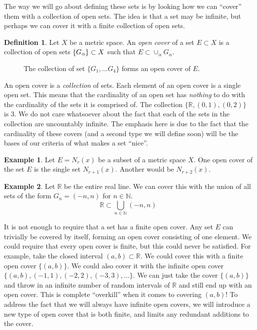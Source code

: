 \documentclass{article}
\newcommand{\N}{\mathbb{N}}
\newcommand{\R}{\mathbb{R}}
\theoremstyle{definition}
\newtheorem{definition}{Definition}[section]
\newtheorem{example}{Example}[section]
\begin{document}
The way we will go about defining these sets is by looking how we can ``cover'' them with a collection of open sets. The idea is that a set may be infinite, but perhaps we can cover it with a finite collection of open sets. 
\begin{definition}
	Let $ X $ be a metric space. An \textit{\color{red}open cover} of a set $ E\subset X $ is a collection of open sets $ \mathcal\{G_\alpha\}\subset X $ such that $ E\subset\cup_\alpha G_\alpha $.  
\end{definition}
  \begin{figure}[h]
	\centering
	\caption{The collection of set $ \{G_1,\ldots G_4\} $ forms an open cover of $ E $.} 
\end{figure}
An open cover is a \textit{collection} of sets. Each element of an open cover is a single open set. This means that the cardinality of an open set has \textit{nothing} to do with the cardinality of the sets it is comprised of. The collection $ \{\R,(0,1),(0,2)\} $ is 3. We do not care whatsoever about the fact that each of the sets in the collection are uncountably infinite. The emphasis here is due to the fact that the cardinality of these covers (and a second type we will define soon) will be the bases of our criteria of what makes a set ``nice''.
\begin{example}
	Let $ E=N_r(x) $ be a subset of a metric space $ X $. One open cover of the set $ E $ is the single set $ N_{r+1}(x) $. Another would be $ N_{r+2}(x) $. 
\end{example}
\begin{example}
	Let $ \R $ be the entire real line. We can cover this with the union of all sets of the form $G_n=(-n,n)$ for $ n\in\N $. $$ \R\subset\bigcup_{n\in \N}(-n,n)$$
\end{example}
It is not enough to require that a set has a finite open cover. Any set $ E $ can trivially be covered by itself, forming an open cover consisting of one element. We could require that every open cover is finite, but this could never be satisfied. For example, take the closed interval $ (a,b)\subset\R $. We could cover this with a finite open cover $ \{(a,b)\} $. We could also cover it with the infinite open cover $ \{(a,b),(-1,1),(-2,2),(-3,3),\ldots\} $. We can just take the cover $ \{(a,b)\} $ and throw in an infinite number of random intervals of $ \R $ and still end up with an open cover. This is complete ``overkill'' when it comes to covering $ (a,b) $! To address the fact that we will always have infinite open covers, we will introduce a new type of open cover that is both finite, and limits any redundant additions to the cover. 
\end{document}
